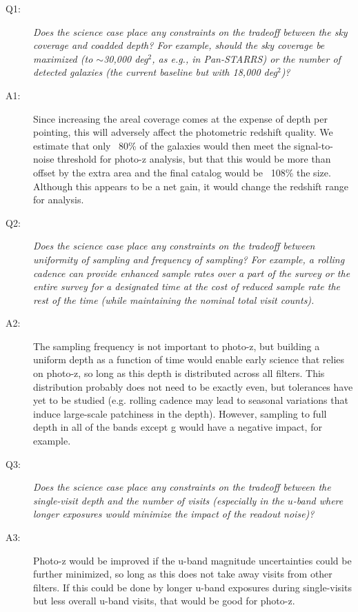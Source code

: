  \begin{description}

 \item[Q1:] {\it Does the science case place any constraints on the
 tradeoff between the sky coverage and coadded depth? For example, should
 the sky coverage be maximized (to $\sim$30,000 deg$^2$, as e.g., in
 Pan-STARRS) or the number of detected galaxies (the current baseline but
 with 18,000 deg$^2$)?}

 \item[A1:] Since increasing the areal coverage comes at the expense of depth per pointing, this will adversely affect the photometric redshift quality. We estimate that only ~80\% of the galaxies would then meet the signal-to-noise threshold for photo-z analysis, but that this would be more than offset by the extra area and the final catalog would be ~108\% the size. Although this appears to be a net gain, it would change the redshift range for analysis.

 \item[Q2:] {\it Does the science case place any constraints on the
 tradeoff between uniformity of sampling and frequency of  sampling? For
 example, a rolling cadence can provide enhanced sample rates over a part
 of the survey or the entire survey for a designated time at the cost of
 reduced sample rate the rest of the time (while maintaining the nominal
 total visit counts).}

 \item[A2:] The sampling frequency is not important to photo-z, but building a uniform depth as a function of time would enable early science that relies on photo-z, so long as this depth is distributed across all filters. This distribution probably does not need to be exactly even, but tolerances have yet to be studied (e.g. rolling cadence may lead to seasonal variations that induce large-scale patchiness in the depth). However, sampling to full depth in all of the bands except g would have a negative impact, for example.

 \item[Q3:] {\it Does the science case place any constraints on the
 tradeoff between the single-visit depth and the number of visits
 (especially in the $u$-band where longer exposures would minimize the
 impact of the readout noise)?}

 \item[A3:] Photo-z would be improved if the u-band magnitude uncertainties could be further minimized, so long as this does not take away visits from other filters. If this could be done by longer u-band exposures during single-visits but less overall u-band visits, that would be good for photo-z.


\end{description}
